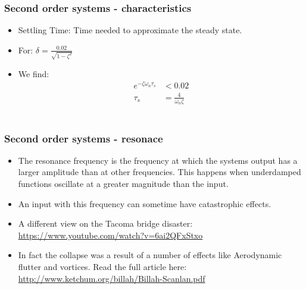 \begin{frame}
\frametitle{Second order systems - characteristics}
\begin{itemize}
\item Settling Time: Time needed to approximate the steady state.
\vspace{0.15cm}
\item For: $\delta = \frac{0.02}{\sqrt{1-\zeta^2}}$
\vspace{0.15cm}
\item We find:
\vspace{-0.55cm}
\begin{align*}
 e^{-\zeta\omega_n\tau_s} &< 0.02
\\\tau_s &= \frac{4}{\omega_n\zeta}
\end{align*}
\\ \begin{figure}
\end{figure}
\end{itemize}
\end{frame}

\begin{frame}
\frametitle{Second order systems - resonace}
\begin{itemize}
\item The resonance frequency is the frequency at which the systems output has a larger amplitude than at other frequencies. This happens when underdamped functions oscillate at a greater magnitude than the input.
\item An input with this frequency can sometime have catastrophic effects.
\item A different view on the Tacoma bridge disaster: \url{https://www.youtube.com/watch?v=6ai2QFxStxo}
\item In fact the collapse was a result of a number of effects like Aerodynamic flutter and vortices. Read the full article here: \url{http://www.ketchum.org/billah/Billah-Scanlan.pdf}
\end{itemize}
\end{frame}

